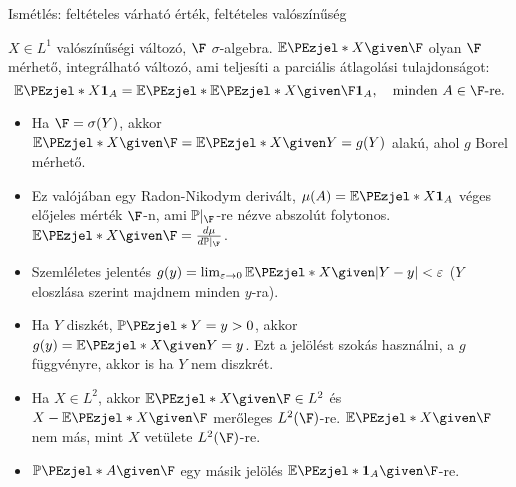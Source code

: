 \documentclass[aspectratio=169,notheorems,9pt,\option]{beamer}
\begin{document}
\begin{frame}{Ismétlés: feltételes várható érték, feltételes valószínűség}
  \begin{df}
    $X\in L^1$ valószínűségi változó, $\F$ $\sigma$-algebra. $\E{X\given \F}$ olyan $\F$ mérhető, integrálható változó, ami teljesíti 
    a parciális átlagolási tulajdonságot:
    \begin{displaymath}
      \E{X\I[A]}=\E{\E{X\given \F}\I[A]},\quad\text{minden $A\in\F$-re}.
    \end{displaymath}
  \end{df}
  \begin{itemize}
    \item Ha $\F=\sigma(Y)$, akkor $\E{X\given \F}=\E{X\given Y}=g(Y)$ alakú, ahol $g$ Borel mérhető.
    \item Ez valójában egy Radon-Nikodym derivált, $\mu(A)=\E{X\I[A]}$ véges előjeles mérték $\F$-n, ami $\P|_{\F}$-re 
    nézve abszolút folytonos. $\E{X\given \F}=\frac{d\mu}{d\P|_{\F}}$.
    \item Szemléletes jelentés $g(y)=\lim_{\eps\to0}\E{X\given \abs*{Y-y}<\eps}$ ($Y$ eloszlása szerint majdnem minden $y$-ra).
    \item Ha $Y$ diszkét, $\P{Y=y}>0$, akkor $g(y)=\E{X\given Y=y}$. Ezt a jelölést szokás használni, a $g$ függvényre, akkor is ha $Y$ nem diszkrét.
    \item Ha $X\in L^2$, akkor $\E{X\given \F}\in L^2$ és $X-\E{X\given \F}$ merőleges $L^2(\F)$-re.
    $\E{X\given \F}$ nem más, mint $X$ vetülete $L^2(\F)$-re.
    \item $\P{A\given \F}$ egy másik jelölés $\E{\I[A]\given \F}$-re.
  \end{itemize}
\end{frame}
\end{document}
